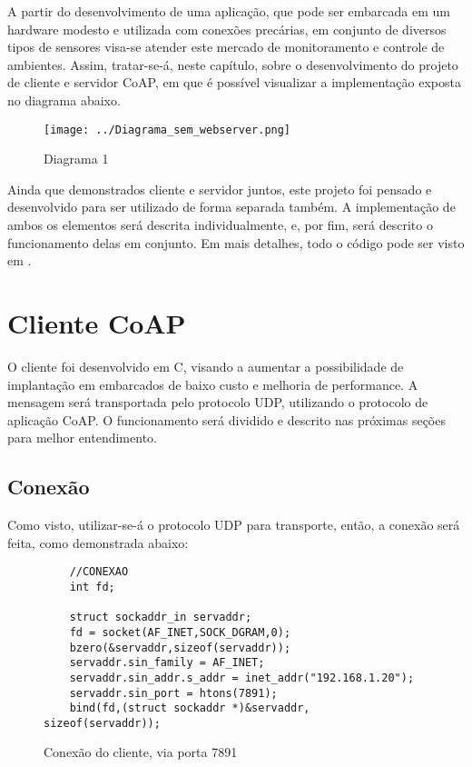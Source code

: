 A partir do desenvolvimento de uma aplicação, que pode ser embarcada em um hardware modesto e utilizada com conexões precárias, em conjunto de diversos tipos de sensores visa-se atender este mercado de monitoramento e controle de ambientes. Assim, tratar-se-á, neste capítulo, sobre o desenvolvimento do projeto de cliente e servidor CoAP, em que é possível visualizar a implementação exposta no diagrama abaixo.

\begin{figure}[!htb]
	\centering
	\texttt{[image: ../Diagrama\_sem\_webserver.png]}
	\caption{Diagrama 1}
	\label{fig:Diagrama_lin_emb}
\end{figure}


Ainda que demonstrados cliente e servidor juntos, este projeto foi pensado e desenvolvido para ser utilizado de forma separada também. A implementação de ambos os elementos será descrita individualmente, e, por fim, será descrito o funcionamento delas em conjunto. Em mais detalhes, todo o código pode ser visto em \cite{cliente_servidor_coap}.

\section{Cliente CoAP}
O cliente foi desenvolvido em C, visando a aumentar a possibilidade de implantação em embarcados de baixo custo e melhoria de performance. A mensagem será transportada pelo protocolo UDP, utilizando o protocolo de aplicação CoAP. O funcionamento será dividido e descrito nas próximas seções para melhor entendimento.


\subsection{Conexão}
Como visto, utilizar-se-á o protocolo UDP para transporte, então, a conexão será feita, como demonstrada abaixo:

\begin{figure}[!htb]
	\begin{lstlisting}
	//CONEXAO
	int fd;
	
	struct sockaddr_in servaddr;
	fd = socket(AF_INET,SOCK_DGRAM,0);
	bzero(&servaddr,sizeof(servaddr));
	servaddr.sin_family = AF_INET;
	servaddr.sin_addr.s_addr = inet_addr("192.168.1.20");
	servaddr.sin_port = htons(7891);
	bind(fd,(struct sockaddr *)&servaddr, sizeof(servaddr));
	\end{lstlisting}
	\caption{Conexão do cliente, via porta 7891}
	\label{code:conexao_cliente}
\end{figure}


